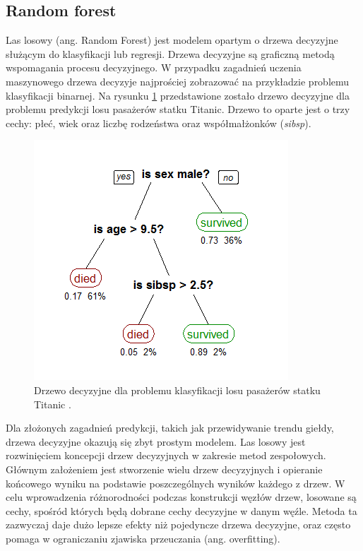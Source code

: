 \documentclass[a4paper, twoside, 11pt, openright]{article}
\begin{document}
\subsection{Random forest}

Las losowy (ang. Random Forest)\cite{randforest} jest modelem opartym o drzewa decyzyjne służącym do klasyfikacji lub regresji. Drzewa decyzyjne są graficzną metodą wspomagania procesu decyzyjnego. W przypadku zagadnień uczenia maszynowego drzewa decyzyje najprościej zobrazować na przykładzie problemu klasyfikacji binarnej. Na rysunku \ref{img:wiki_dec_tree} przedstawione zostało drzewo decyzyjne dla problemu predykcji losu pasażerów statku Titanic. Drzewo to oparte jest o trzy cechy: płeć, wiek oraz liczbę rodzeństwa oraz współmałżonków (\textit{sibsp}). 

\begin{figure}[H]
\centering \includegraphics[scale=0.6]{img/decision_tree.png}
\caption{Drzewo decyzyjne dla problemu klasyfikacji losu pasażerów statku Titanic \cite{wikidecisiontree}.}
\label{img:wiki_dec_tree}
\end{figure}

Dla złożonych zagadnień predykcji, takich jak przewidywanie trendu giełdy, drzewa decyzyjne okazują się zbyt prostym modelem. Las losowy jest rozwinięciem koncepcji drzew decyzyjnych w zakresie metod zespołowych. Głównym założeniem jest stworzenie wielu drzew decyzyjnych i opieranie końcowego wyniku na podstawie poszczególnych wyników każdego z drzew. W celu wprowadzenia różnorodności podczas konstrukcji węzłów drzew, losowane są cechy, spośród których będą dobrane cechy decyzyjne w danym węźle. Metoda ta zazwyczaj daje dużo lepsze efekty niż pojedyncze drzewa decyzyjne, oraz często pomaga w ograniczaniu zjawiska przeuczania (ang. overfitting).  
\end{document}
